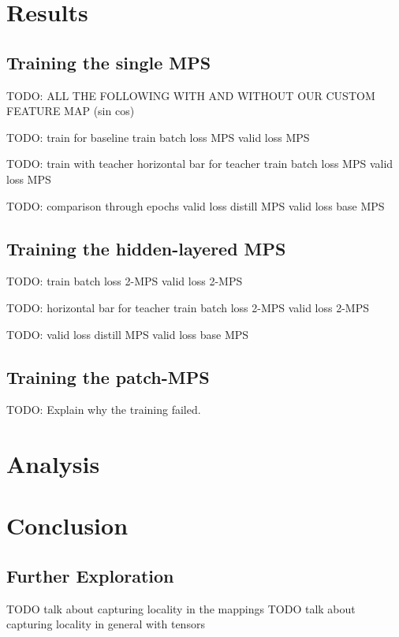\documentclass[11pt]{article}
\theoremstyle{definition}
\theoremstyle{definition}
\begin{document}
\section{Results}
\subsection{Training the single MPS}
TODO: ALL THE FOLLOWING WITH AND WITHOUT OUR CUSTOM FEATURE MAP (sin cos)

TODO: train for baseline
train batch loss MPS
valid loss MPS

TODO: train with teacher
horizontal bar for teacher
train batch loss MPS
valid loss MPS

TODO: comparison through epochs
valid loss distill MPS
valid loss base MPS

\subsection{Training the hidden-layered MPS}
TODO: 
train batch loss 2-MPS
valid loss 2-MPS




TODO: 
horizontal bar for teacher
train batch loss 2-MPS
valid loss 2-MPS

TODO: 
valid loss distill MPS
valid loss base MPS

\subsection{Training the patch-MPS}
TODO: Explain why the training failed.


\section{Analysis}




\section{Conclusion}



\subsection{Further Exploration}
TODO talk about capturing locality in the mappings
TODO talk about capturing locality in general with tensors

\printbibliography
\end{document}
